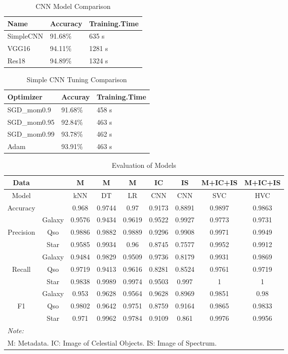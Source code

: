 \documentclass[
  11pt,
]{article}
\begin{document}
\begin{table}[H]
\centering
\caption{CNN Model Comparison}
\label{tab:cnn-comp}
\centering
\begin{tabular}[t]{lll}
\toprule
Name & Accuracy & Training.Time\\
\midrule
SimpleCNN & 91.68\% & 635 s\\
VGG16 & 94.11\% & 1281 s\\
Res18 & 94.89\% & 1324 s\\
\bottomrule
\end{tabular}
\end{table}

\begin{table}[H]
\centering
\caption{Simple CNN Tuning Comparison}
\label{tab:simple-cnn}
\centering
\begin{tabular}[t]{lll}
\toprule
Optimizer & Accuray & Training.Time\\
\midrule
SGD\_mom0.9 & 91.68\% & 458 s\\
SGD\_mom0.95 & 92.84\% & 463 s\\
SGD\_mom0.99 & 93.78\% & 462 s\\
Adam & 93.91\% & 463 s\\
\bottomrule
\end{tabular}
\end{table}

\begin{table}[H]
\centering
\caption{Evaluation of Models}
\label{tab:eval}
\centering
\begin{tabular}[t]{ccccccccc}
\toprule
Data &  & M & M & M & IC & IS & M+IC+IS & M+IC+IS\\
\midrule
Model &  & kNN & DT & LR & CNN & CNN & SVC & HVC\\
\midrule
Accuracy &  & 0.968 & 0.9744 & 0.97 & 0.9173 & 0.8891 & 0.9897 & 0.9863\\
\addlinespace
& Galaxy & 0.9576 & 0.9434 & 0.9619 & 0.9522 & 0.9927 & 0.9773 & 0.9731\\
Precision & Qso & 0.9886 & 0.9882 & 0.9889 & 0.9296 & 0.9908 & 0.9971 & 0.9949\\
& Star & 0.9585 & 0.9934 & 0.96 & 0.8745 & 0.7577 & 0.9952 & 0.9912\\
\addlinespace
& Galaxy & 0.9484 & 0.9829 & 0.9509 & 0.9736 & 0.8179 & 0.9931 & 0.9869\\
Recall & Qso & 0.9719 & 0.9413 & 0.9616 & 0.8281 & 0.8524 & 0.9761 & 0.9719\\
& Star & 0.9838 & 0.9989 & 0.9974 & 0.9503 & 0.997 & 1 & 1\\
\addlinespace
& Galaxy & 0.953 & 0.9628 & 0.9564 & 0.9628 & 0.8969 & 0.9851 & 0.98\\
F1 & Qso & 0.9802 & 0.9642 & 0.9751 & 0.8759 & 0.9164 & 0.9865 & 0.9833\\
& Star & 0.971 & 0.9962 & 0.9784 & 0.9109 & 0.861 & 0.9976 & 0.9956\\
\bottomrule
\multicolumn{9}{l}{\rule{0pt}{1em}\textit{Note: }}\\
\multicolumn{9}{l}{\rule{0pt}{1em}M: Metadata. IC: Image of Celestial Objects. IS: Image of Spectrum.}\\
\end{tabular}
\end{table}
\end{document}
